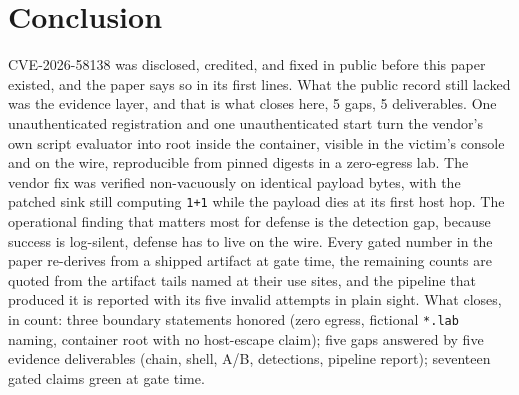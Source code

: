 \documentclass[journal]{IEEEtran}
\begin{document}
\section{Conclusion}
\label{sec:conclusion}

CVE-2026-58138 was disclosed, credited, and fixed in public before this paper
existed, and the paper says so in its first lines. What the public record
still lacked was the evidence layer, and that is what closes here, 5 gaps, 5
deliverables. One unauthenticated registration and one unauthenticated start
turn the vendor's own script evaluator into root inside the container, visible
in the victim's console and on the wire, reproducible from pinned digests in a
zero-egress lab. The vendor fix was verified non-vacuously on identical
payload bytes, with the patched sink still computing \texttt{1+1} while the
payload dies at its first host hop. The operational finding that matters most
for defense is the detection gap, because success is log-silent, defense has
to live on the wire. Every gated number in the paper re-derives from a shipped
artifact at gate time, the remaining counts are quoted from the artifact tails
named at their use sites, and the pipeline that produced it is reported with its
five invalid attempts in plain sight. What closes, in count: three boundary
statements honored (zero egress, fictional \texttt{*.lab} naming, container
root with no host-escape claim); five gaps answered by five evidence
deliverables (chain, shell, A/B, detections, pipeline report); seventeen gated
claims green at gate time.
\end{document}
